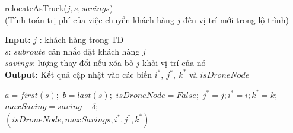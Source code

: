 \documentclass[a4paper,12pt]{report}
\begin{document}
\begin{algorithm}[H]
\caption{relocateAsTruck($j,s,savings$)\\(Tính toán trị phí của việc chuyển khách hàng $j$ đến vị trí mới trong lộ trình)}
\textbf{Input:} $j$ : khách hàng trong TD\\ $s$: $subroute$ cân nhắc đặt khách hàng $j$ \\ $savings$: lượng thay đổi nếu xóa bỏ $j$ khỏi vị trí của nó\\
\textbf{Output:} Kết quả cập nhật vào các biến $i^*, \ j^*, \ k^*$ và $isDroneNode$
\begin{algorithmic}[1]
\State $a=first(s);$
\State $b=last(s);$
\State $isDroneNode=False;$
\State $j^*=j;i^*=i;k^*=k;$
\State $maxSaving=saving-\delta;$
\EndIf
\EndIf
\EndIf
\EndIf
\EndFor\\
\Return 	$(isDroneNode,maxSavings,i^*,j^*,k^*)$
\end{algorithmic}

\label{alg:tspls3}
\end{algorithm}
\end{document}
